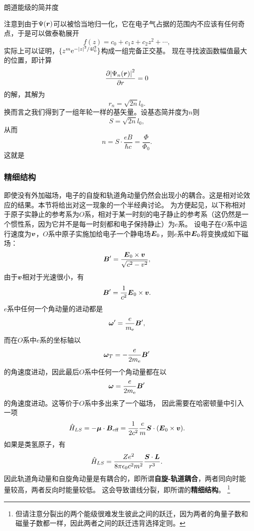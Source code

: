 \documentclass[UTF8, a4paper]{ctexart}
\newcommand*{\ee}{\mathrm{e}}
\begin{document}
朗道能级的简并度

注意到由于$\Psi(\vb*{r})$可以被恰当地归一化，它在电子气占据的范围内不应该有任何奇点，于是可以做泰勒展开
\[
    f(z) = c_0 + c_1 z + c_2 z^2 + \cdots,
\]
实际上可以证明，$\{z^m \ee^{- \abs{z}^2 / 4 l_0^2}\}$构成一组完备正交基。
现在寻找波函数幅值最大的位置，即计算
\[
    \pdv{\abs{\Psi_n(\vb*{r})}^2}{r} = 0
\]
的解，其解为
\[
    r_n = \sqrt{2n} l_0.
\]
换而言之我们得到了一组年轮一样的基矢量。设基态简并度为$n$则
\[
    S = \sqrt{2n} l_0,
\]
从而
\[
    n = S \cdot \frac{eB}{\hbar c} = \frac{\Phi}{\Phi_0}.
\]
这就是

\subsubsection{精细结构}

即使没有外加磁场，电子的自旋和轨道角动量仍然会出现小的耦合。这是相对论效应的结果。本节将给出对这一现象的一个半经典讨论。
为方便起见，以下称相对于原子实静止的参考系为$O$系，相对于某一时刻的电子静止的参考系（这仍然是一个惯性系，因为它并不是每一时刻都和电子保持静止）为$e$系。
设电子在$O$系中运行速度为$\vb*{v}$，$O$系中原子实施加给电子一个静电场$\vb*{E}_0$，则$e$系中$\vb*{E}_0$将变换成如下磁场：
\[
    \vb*{B}' = \frac{\vb*{E}_0 \times \vb*{v}}{\sqrt{c^2 - v^2}},
\]
由于$\vb*{v}$相对于光速很小，有
\begin{equation}
    \vb*{B}' = \frac{1}{c^2} \vb*{E}_0 \times \vb*{v}.
\end{equation}
$e$系中任何一个角动量的进动都是%
\[
    \vb*{\omega}' = \frac{e}{m_\text{e}} \vb*{B}',
\]
而在$O$系中$e$系的坐标轴以
\[
    \vb*{\omega}_T = - \frac{e}{2 m_\text{e}} \vb*{B}'
\]
的角速度进动，因此最后$O$系中任何一个角动量都在以
\begin{equation}
    \vb*{\omega} = \frac{e}{2 m_\text{e}} \vb*{B}'
\end{equation}
的角速度进动。这等价于$O$系中多出来了一个磁场，%
因此需要在哈密顿量中引入一项
\begin{equation}
    \hat{H}_{LS} = - \vb*{\mu} \cdot \vb*{B}_\text{eff} = \frac{1}{2c^2} \frac{e}{m} \vb*{S} \cdot (\vb*{E}_0 \times \vb*{v}).
\end{equation}
如果是类氢原子，有
\begin{equation}
    \hat{H}_{LS} = \frac{Ze^2}{8 \pi \epsilon_0 c^2 m^2} \frac{\vb*{S} \cdot \vb*{L}}{r^3}.
    \label{eq:spin-ortibal-coupling}
\end{equation}
因此轨道角动量和自旋角动量是有耦合的，即所谓\textbf{自旋-轨道耦合}，两者同向时能量较高，两者反向时能量较低。
这会导致谱线分裂，即所谓的\textbf{精细结构}。%
\footnote{但请注意分裂出的两个能级很难发生彼此之间的跃迁，因为两者的角量子数和磁量子数都一样，因此两者之间的跃迁违背选择定则。}%
\end{document}
